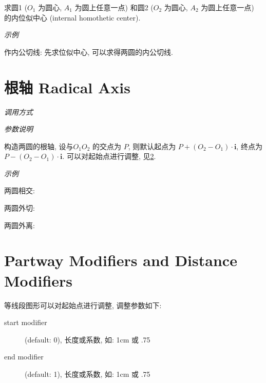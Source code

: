 求圆1 ($O_1$ 为圆心, $A_1$ 为圆上任意一点)
和圆2 ($O_2$ 为圆心, $A_2$ 为圆上任意一点) 
的内位似中心 (internal homothetic center)\cite{HOMO}.

\emph{示例}

作内公切线: 先求位似中心, 可以求得两圆的内公切线.


\section{根轴 Radical Axis}

\emph{调用方式}

\begin{tcolorbox}{}
\end{tcolorbox}

\emph{参数说明}

构造两圆的根轴, 设与$O_1O_2$ 的交点为 $P$, 则默认起点为 $P+(O_2-O_1) \cdot \mathbf{i}$, 终点为 $P-(O_2-O_1) \cdot \mathbf{i}$.
可以对起始点进行调整, 见\ref{sec:modifiers}.

\emph{示例}

两圆相交:


两圆外切:


两圆外离:


\section{Partway Modifiers and Distance Modifiers}\label{sec:modifiers}

等线段图形可以对起始点进行调整, 调整参数如下\cite{CALC}:

\begin{description}
  \item[start modifier] (default: 0), 长度或系数, 如: 1cm 或 .75
  \item[end modifier] (default: 1), 长度或系数, 如: 1cm 或 .75
\end{description}


